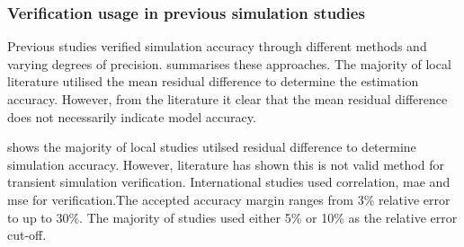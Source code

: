  	\subsubsection{Verification usage in previous simulation studies}
 	Previous studies verified simulation accuracy through different methods and varying degrees of precision.  summarises these approaches. The majority of local literature utilised the mean residual difference to determine the estimation accuracy. However, from the literature it clear that the mean residual difference does not necessarily indicate model accuracy. 
 	\par 
 	  shows the majority of local studies utilsed residual difference to determine simulation accuracy. However, literature has shown this is not valid method for transient simulation verification. International studies used correlation, \gls{mae} and \gls{mse} for verification.The accepted accuracy margin ranges from 3\% relative error to  up to 30\%. The majority of studies used either 5\% or 10\%  as the relative error cut-off.
